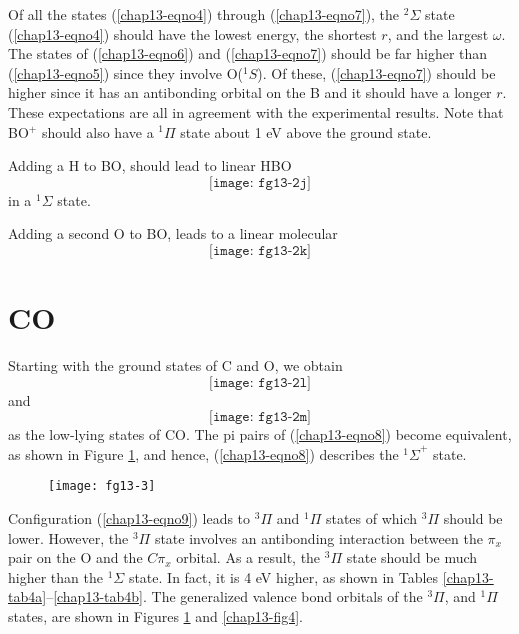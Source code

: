 Of all the states (\ref{chap13-eqno4}) through (\ref{chap13-eqno7}),
the ${^2\Sigma}$ state (\ref{chap13-eqno4}) should have the lowest
energy, the shortest $r$, and the largest $\omega$. The states of
(\ref{chap13-eqno6}) and (\ref{chap13-eqno7}) should be far higher
than (\ref{chap13-eqno5}) since they involve O(${^1S}$).  Of these,
(\ref{chap13-eqno7}) should be higher since it has an antibonding
orbital on the B and it should have a longer $r$. These expectations
are all in agreement with the experimental results. Note that BO$^+$
should also have a ${^1\Pi}$ state about 1 eV above the ground state.

Adding a H to BO, should lead to linear HBO
\begin{equation}
\texttt{[image: fg13-2j]}
\end{equation}
in a ${^1\Sigma}$ state.

Adding a second O to BO, leads to a linear molecular
\begin{equation}
\texttt{[image: fg13-2k]}
\end{equation}

\section{CO}

Starting with the ground states of C and O, we obtain
\begin{equation}
\texttt{[image: fg13-2l]}
\label{chap13-eqno8}
\end{equation}
and
\begin{equation}
\texttt{[image: fg13-2m]}
\label{chap13-eqno9}
\end{equation}
as the low-lying states of CO.  The pi pairs of (\ref{chap13-eqno8})
become equivalent, as shown in Figure \ref{chap13-fig3}, and hence,
(\ref{chap13-eqno8}) describes the ${^1\Sigma}^+$ state.

\begin{figure}
\texttt{[image: fg13-3]}
\caption{}
\label{chap13-fig3}
\end{figure}


Configuration (\ref{chap13-eqno9}) leads to ${^3\Pi}$ and ${^1\Pi}$
states of which ${^3\Pi}$ should be lower.  However, the ${^3\Pi}$
state involves an antibonding interaction between the $\pi_x$ pair on
the O and the $C \pi_x$ orbital.  As a result, the ${^3\Pi}$ state
should be much higher than the ${^1\Sigma}$ state.  In fact, it is 4
eV higher, as shown in Tables
\ref{chap13-tab4a}--\ref{chap13-tab4b}. The generalized valence bond
orbitals of the ${^3\Pi}$, and ${^1\Pi}$ states, are shown in Figures
\ref{chap13-fig3} and \ref{chap13-fig4}.

